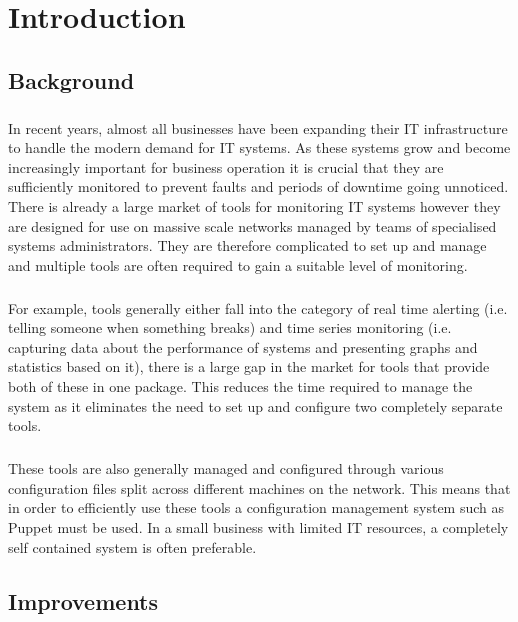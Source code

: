\documentclass[bsc,logo,twoside]{infthesis}
\begin{document}
\chapter{Introduction}
\section{Background}
\paragraph*{}
	In recent years, almost all businesses have been expanding their IT 
	infrastructure to handle the modern demand for IT systems.  As these systems
	grow and become increasingly important for business operation it is crucial
	that they are sufficiently monitored to prevent faults and periods of downtime
	going unnoticed.  There is already a large market of tools for monitoring
	IT systems however they are designed for use on massive scale networks managed
	by teams of specialised systems administrators.  They are therefore
	complicated to set up and manage and multiple tools are often required to gain
	a suitable level of monitoring.
	
\paragraph*{}
	For example, tools generally either fall into
	the category of real time alerting (i.e. telling someone when something
	breaks) and time series monitoring (i.e. capturing data about the performance
	of systems and presenting graphs and statistics based on it), there is a large
	gap in the market for tools that provide both of these in one package. This
	reduces the time required to manage the system as it eliminates the need to
	set up and configure two completely separate tools.

\paragraph*{}	
	These tools are also generally managed and configured through various
	configuration files split across different machines on the network. This means
	that in order to efficiently use these tools a configuration management system
	such as	Puppet must be used. In a small business with limited IT resources, a
	completely self contained system is often preferable.

\section{Improvements}
\end{document}
